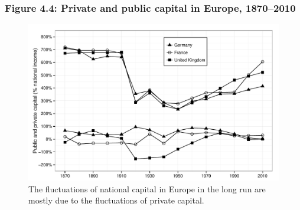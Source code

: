 \documentclass[t]{beamer}\usepackage[]{graphicx}\usepackage[]{color}
\newenvironment{knitrout}{}{} %
\begin{document}
\begin{frame}[label=Figure_4_4]
\frametitle{Figure 4.4: Private and public capital in Europe, 1870--2010}
\begin{figure}[t]
\begin{minipage}[b]{\textwidth}
\centering
\begin{knitrout}\footnotesize
{}\color{fgcolor}

{\centering \includegraphics[width=1\linewidth]{figures/bw/Figure_4_4} 

}



\end{knitrout}
\caption{The fluctuations of national capital in Europe in the long run are mostly due to the fluctuations of private capital.}
\end{minipage}
\end{figure}
\end{frame}
\end{document}
